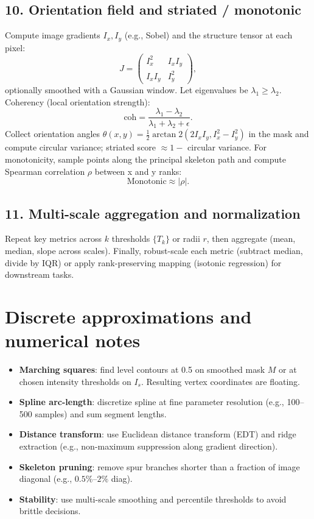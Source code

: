 \documentclass[11pt]{article}
\begin{document}
\subsection{10. Orientation field and striated / monotonic}
Compute image gradients \(I_x,I_y\) (e.g., Sobel) and the structure tensor at each pixel:
\[
J = \begin{pmatrix} I_x^2 & I_x I_y \\ I_x I_y & I_y^2 \end{pmatrix},
\]
optionally smoothed with a Gaussian window. Let eigenvalues be \(\lambda_1\ge\lambda_2\). Coherency (local orientation strength):
\[
\text{coh} = \frac{\lambda_1 - \lambda_2}{\lambda_1 + \lambda_2 + \epsilon}.
\]
Collect orientation angles \(\theta(x,y)=\tfrac{1}{2}\arctan2(2I_xI_y, I_x^2 - I_y^2)\) in the mask and compute circular variance; striated score \(\approx 1-\) circular variance. For monotonicity, sample points along the principal skeleton path and compute Spearman correlation \(\rho\) between x and y ranks:
\[
\text{Monotonic} \approx |\rho|.
\]

\subsection{11. Multi-scale aggregation and normalization}
Repeat key metrics across \(k\) thresholds \(\{T_k\}\) or radii \(r\), then aggregate (mean, median, slope across scales). Finally, robust-scale each metric (subtract median, divide by IQR) or apply rank-preserving mapping (isotonic regression) for downstream tasks.

\section{Discrete approximations and numerical notes}
\begin{itemize}
  \item \textbf{Marching squares}: find level contours at 0.5 on smoothed mask \(M\) or at chosen intensity thresholds on \(I_s\). Resulting vertex coordinates are floating.
  \item \textbf{Spline arc-length}: discretize spline at fine parameter resolution (e.g., 100--500 samples) and sum segment lengths.
  \item \textbf{Distance transform}: use Euclidean distance transform (EDT) and ridge extraction (e.g., non-maximum suppression along gradient direction).
  \item \textbf{Skeleton pruning}: remove spur branches shorter than a fraction of image diagonal (e.g., \(0.5\%\)--\(2\%\) diag).
  \item \textbf{Stability}: use multi-scale smoothing and percentile thresholds to avoid brittle decisions.
\end{itemize}
\end{document}
